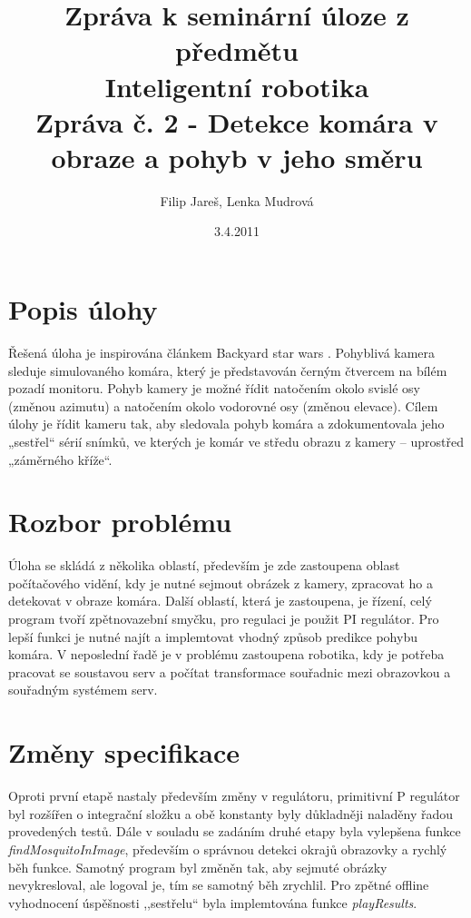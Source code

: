 \documentclass[a4paper,10pt]{article}
\title{Zpráva k seminární úloze z předmětu\\ Inteligentní robotika \\ {\small Zpráva č. 2 - Detekce komára v obraze a pohyb v jeho směru}}
\author{Filip Jareš, Lenka Mudrová}
\date{3.4.2011}
\begin{document}
\maketitle
\newpage


\section{Popis úlohy}

Řešená úloha je inspirována článkem Backyard star wars \cite{zadani}. Pohyblivá kamera sleduje simulovaného komára, který je představován černým čtvercem na bílém pozadí monitoru. Pohyb kamery je možné řídit natočením okolo svislé osy (změnou azimutu) a natočením okolo vodorovné osy (změnou elevace). Cílem úlohy je řídit kameru tak, aby sledovala pohyb komára a zdokumentovala jeho „sestřel“ sérií snímků, ve kterých je komár ve středu obrazu z kamery – uprostřed „záměrného kříže“.

\section{Rozbor problému}

Úloha se skládá z několika oblastí, především je zde zastoupena oblast počítačového vidění, kdy je nutné sejmout obrázek z kamery, zpracovat ho a detekovat v obraze komára. Další oblastí, která je zastoupena, je řízení, celý program tvoří zpětnovazební smyčku, pro regulaci je použit PI regulátor. Pro lepší funkci je nutné najít a implemtovat vhodný způsob predikce pohybu komára. V neposlední řadě je v problému zastoupena robotika, kdy je potřeba pracovat se soustavou serv a počítat transformace souřadnic mezi obrazovkou a souřadným systémem serv.

\section{Změny specifikace}

Oproti první etapě nastaly především změny v regulátoru, primitivní P regulátor byl rozšířen o integrační složku a obě konstanty byly důkladněji naladěny řadou provedených testů. Dále v souladu se zadáním druhé etapy byla vylepšena funkce \textit{findMosquitoInImage}, především o správnou detekci okrajů obrazovky a rychlý běh funkce. Samotný program byl změněn tak, aby sejmuté obrázky nevykresloval, ale logoval je, tím se samotný běh zrychlil. Pro zpětné offline vyhodnocení úspěšnosti ,,sestřelu`` byla implemtována funkce \textit{playResults}.
\end{document}
